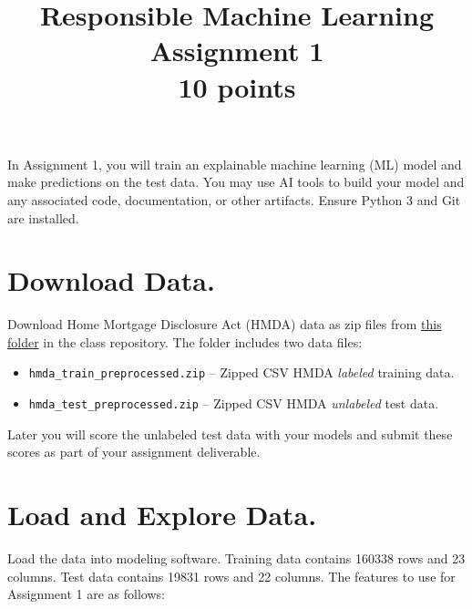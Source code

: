 \documentclass[fleqn]{article}
\title{Responsible Machine Learning\\\Large{Assignment 1}\\\Large{10 points}}
\begin{document}
\maketitle

\noindent In Assignment 1, you will train an explainable machine learning (ML) model and make predictions on the test data. You may use AI tools to build your model and any associated code, documentation, or other artifacts. Ensure Python 3 and Git are installed.

\section{Download Data.}

Download Home Mortgage Disclosure Act (HMDA) data as zip files from \href{https://github.com/jphall663/GWU_rml/tree/master/assignment/data}{this folder} in the class repository. The folder includes two data files:

\begin{itemize}
	\item \texttt{hmda\_train\_preprocessed.zip} -- Zipped CSV HMDA \textit{labeled} training data.
	\item \texttt{hmda\_test\_preprocessed.zip} -- Zipped CSV HMDA \textit{unlabeled} test data.
\end{itemize}

\noindent Later you will score the unlabeled test data with your models and submit these scores as part of your assignment deliverable.

\section{Load and Explore Data.}

Load the data into modeling software. Training data contains 160338 rows and 23 columns. Test data contains 19831 rows and 22 columns. The features to use for Assignment 1 are as follows:
\end{document}
